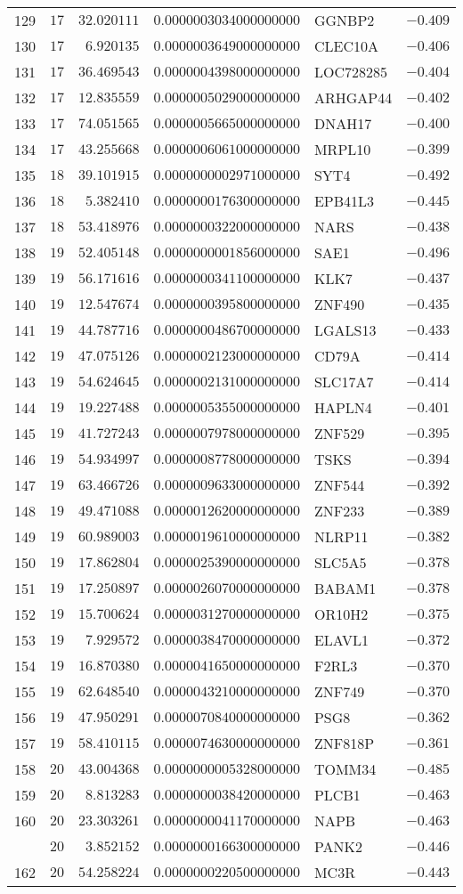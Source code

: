 {\begin{longtable}{lrrrlr}
129&$17$&$ 32.020111$&$0.0000003034000000000$&GGNBP2&$-0.409$\tabularnewline
130&$17$&$  6.920135$&$0.0000003649000000000$&CLEC10A&$-0.406$\tabularnewline
131&$17$&$ 36.469543$&$0.0000004398000000000$&LOC728285&$-0.404$\tabularnewline
132&$17$&$ 12.835559$&$0.0000005029000000000$&ARHGAP44&$-0.402$\tabularnewline
133&$17$&$ 74.051565$&$0.0000005665000000000$&DNAH17&$-0.400$\tabularnewline
134&$17$&$ 43.255668$&$0.0000006061000000000$&MRPL10&$-0.399$\tabularnewline
135&$18$&$ 39.101915$&$0.0000000002971000000$&SYT4&$-0.492$\tabularnewline
136&$18$&$  5.382410$&$0.0000000176300000000$&EPB41L3&$-0.445$\tabularnewline
137&$18$&$ 53.418976$&$0.0000000322000000000$&NARS&$-0.438$\tabularnewline
138&$19$&$ 52.405148$&$0.0000000001856000000$&SAE1&$-0.496$\tabularnewline
139&$19$&$ 56.171616$&$0.0000000341100000000$&KLK7&$-0.437$\tabularnewline
140&$19$&$ 12.547674$&$0.0000000395800000000$&ZNF490&$-0.435$\tabularnewline
141&$19$&$ 44.787716$&$0.0000000486700000000$&LGALS13&$-0.433$\tabularnewline
142&$19$&$ 47.075126$&$0.0000002123000000000$&CD79A&$-0.414$\tabularnewline
143&$19$&$ 54.624645$&$0.0000002131000000000$&SLC17A7&$-0.414$\tabularnewline
144&$19$&$ 19.227488$&$0.0000005355000000000$&HAPLN4&$-0.401$\tabularnewline
145&$19$&$ 41.727243$&$0.0000007978000000000$&ZNF529&$-0.395$\tabularnewline
146&$19$&$ 54.934997$&$0.0000008778000000000$&TSKS&$-0.394$\tabularnewline
147&$19$&$ 63.466726$&$0.0000009633000000000$&ZNF544&$-0.392$\tabularnewline
148&$19$&$ 49.471088$&$0.0000012620000000000$&ZNF233&$-0.389$\tabularnewline
149&$19$&$ 60.989003$&$0.0000019610000000000$&NLRP11&$-0.382$\tabularnewline
150&$19$&$ 17.862804$&$0.0000025390000000000$&SLC5A5&$-0.378$\tabularnewline
151&$19$&$ 17.250897$&$0.0000026070000000000$&BABAM1&$-0.378$\tabularnewline
152&$19$&$ 15.700624$&$0.0000031270000000000$&OR10H2&$-0.375$\tabularnewline
153&$19$&$  7.929572$&$0.0000038470000000000$&ELAVL1&$-0.372$\tabularnewline
154&$19$&$ 16.870380$&$0.0000041650000000000$&F2RL3&$-0.370$\tabularnewline
155&$19$&$ 62.648540$&$0.0000043210000000000$&ZNF749&$-0.370$\tabularnewline
156&$19$&$ 47.950291$&$0.0000070840000000000$&PSG8&$-0.362$\tabularnewline
157&$19$&$ 58.410115$&$0.0000074630000000000$&ZNF818P&$-0.361$\tabularnewline
158&$20$&$ 43.004368$&$0.0000000005328000000$&TOMM34&$-0.485$\tabularnewline
159&$20$&$  8.813283$&$0.0000000038420000000$&PLCB1&$-0.463$\tabularnewline
160&$20$&$ 23.303261$&$0.0000000041170000000$&NAPB&$-0.463$\tabularnewline
\newpage
161&$20$&$  3.852152$&$0.0000000166300000000$&PANK2&$-0.446$\tabularnewline
162&$20$&$ 54.258224$&$0.0000000220500000000$&MC3R&$-0.443$\tabularnewline

\end{longtable}}
